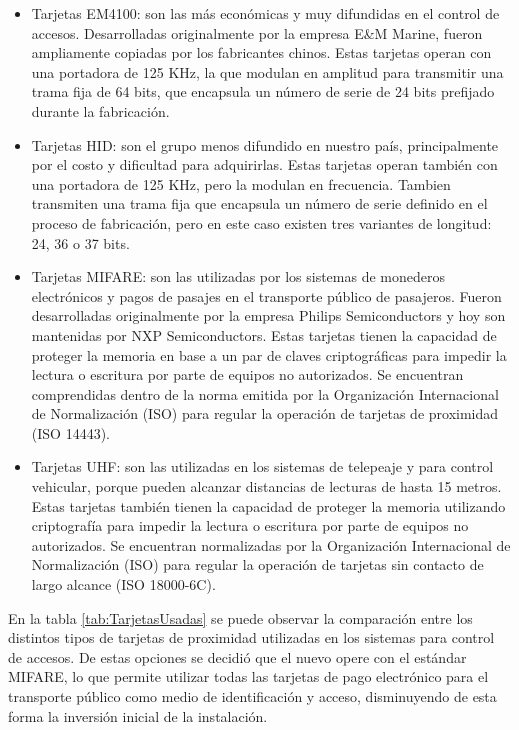 \begin{itemize}
	\item Tarjetas EM4100: son las más económicas y muy difundidas en el control de accesos. Desarrolladas originalmente por la empresa E\&M Marine, fueron ampliamente copiadas por los fabricantes chinos. Estas tarjetas operan con una portadora de 125 KHz, la que modulan en amplitud para transmitir una trama fija de 64 bits, que encapsula un número de serie de 24 bits prefijado durante la fabricación.
	
	\item Tarjetas HID: son el grupo menos difundido en nuestro país, principalmente por el costo y dificultad para adquirirlas. Estas tarjetas operan también con una portadora de 125 KHz, pero la modulan en frecuencia. Tambien transmiten una trama fija que encapsula un número de serie definido en el proceso de fabricación, pero en este caso existen tres variantes de longitud: 24, 36 o 37 bits.
	
	\item Tarjetas MIFARE: son las utilizadas por los sistemas de monederos electrónicos y pagos de pasajes en el transporte público de pasajeros. Fueron desarrolladas originalmente por la empresa Philips Semiconductors y hoy son mantenidas por NXP Semiconductors. Estas tarjetas tienen la capacidad de proteger la memoria en base a un par de claves criptográficas para impedir la lectura o escritura por parte de equipos no autorizados. Se encuentran comprendidas dentro de la norma emitida por la Organización Internacional de Normalización (ISO) para regular la operación de tarjetas de proximidad (ISO 14443).
	
	\item Tarjetas UHF: son las utilizadas en los sistemas de telepeaje y para control vehicular, porque pueden alcanzar distancias de lecturas de hasta 15 metros. Estas tarjetas también tienen la capacidad de proteger la memoria utilizando criptografía para impedir la lectura o escritura por parte de equipos no autorizados. Se encuentran normalizadas por la Organización Internacional de Normalización (ISO) para regular la operación de tarjetas sin contacto de largo alcance (ISO 18000-6C).
\end{itemize}

En la tabla \ref{tab:TarjetasUsadas} se puede observar la comparación entre los distintos tipos de tarjetas de proximidad utilizadas en los sistemas para control de accesos. De estas opciones se decidió que el nuevo opere con el estándar MIFARE, lo que permite utilizar todas las tarjetas de pago electrónico para el transporte público como medio de identificación y acceso, disminuyendo de esta forma la inversión inicial de la instalación.

